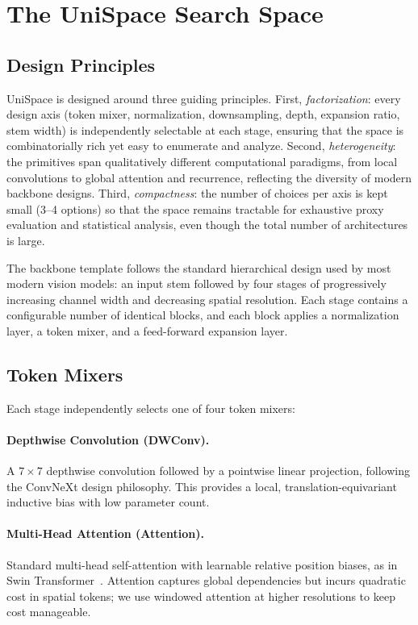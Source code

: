 \documentclass[10pt,twocolumn,letterpaper]{article}
\newcommand{\method}{UniSpace\xspace}
\begin{document}
\section{The \method Search Space}
\label{sec:space}

\subsection{Design Principles}
\label{sec:design}

\method is designed around three guiding principles. 
First, \emph{factorization}: every design axis (token mixer, normalization, downsampling, depth, expansion ratio, stem width) is independently selectable at each stage, ensuring that the space is combinatorially rich yet easy to enumerate and analyze. 
Second, \emph{heterogeneity}: the primitives span qualitatively different computational paradigms, from local convolutions to global attention and recurrence, reflecting the diversity of modern backbone designs. 
Third, \emph{compactness}: the number of choices per axis is kept small (3--4 options) so that the space remains tractable for exhaustive proxy evaluation and statistical analysis, even though the total number of architectures is large.

The backbone template follows the standard hierarchical design used by most modern vision models: an input stem followed by four stages of progressively increasing channel width and decreasing spatial resolution. 
Each stage contains a configurable number of identical blocks, and each block applies a normalization layer, a token mixer, and a feed-forward expansion layer.

\subsection{Token Mixers}
\label{sec:mixers}

Each stage independently selects one of four token mixers:

\paragraph{Depthwise Convolution (DWConv).}
A $7 \times 7$ depthwise convolution followed by a pointwise linear projection, following the ConvNeXt design philosophy. This provides a local, translation-equivariant inductive bias with low parameter count.

\paragraph{Multi-Head Attention (Attention).}
Standard multi-head self-attention with learnable relative position biases, as in Swin Transformer~\cite{liu2021swin}. Attention captures global dependencies but incurs quadratic cost in spatial tokens; we use windowed attention at higher resolutions to keep cost manageable.
\end{document}
